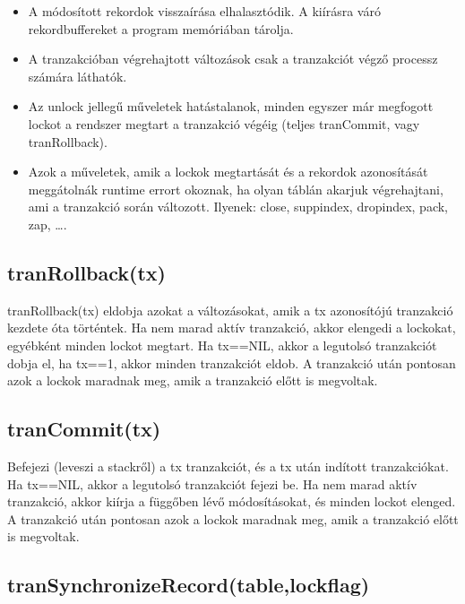 \begin{itemize}
\item
  A módosított rekordok visszaírása elhalasztódik. A kiírásra váró 
  rekordbuffereket a program memóriában tárolja. 

\item  
  A tranzakcióban végrehajtott változások csak a tranzakciót végző
  processz számára láthatók.

\item  
  Az unlock jellegű műveletek hatástalanok, minden egyszer már 
  megfogott lockot a rendszer megtart a tranzakció végéig 
  (teljes tranCommit, vagy tranRollback).
  
\item
  Azok a műveletek, amik a lockok megtartását és a rekordok
  azonosítását meggátolnák runtime errort okoznak, ha olyan
  táblán akarjuk végrehajtani, ami a tranzakció során változott.
  Ilyenek: close, suppindex, dropindex, pack, zap, \ldots.
  
\end{itemize}
   

\subsection{tranRollback(tx)}
 
tranRollback(tx) 
eldobja azokat a változásokat, amik a tx azonosítójú
tranzakció kezdete óta történtek. 
Ha nem marad aktív tranzakció, akkor elengedi a lockokat, 
egyébként minden lockot megtart. Ha tx==NIL, akkor a legutolsó
tranzakciót dobja el, ha tx==1, akkor minden tranzakciót eldob.
A tranzakció után pontosan azok a lockok maradnak meg,
amik a tranzakció előtt is megvoltak.
 
 
\subsection{tranCommit(tx)}
Befejezi (leveszi a stackről) a tx tranzakciót, és a tx után indított 
tranzakciókat. Ha tx==NIL, akkor a legutolsó tranzakciót fejezi be.
Ha nem marad aktív tranzakció, akkor kiírja
a függőben lévő módosításokat, és minden lockot elenged.
A tranzakció után pontosan azok a lockok maradnak meg,
amik a tranzakció előtt is megvoltak.

\subsection{tranSynchronizeRecord(table,lockflag)}


